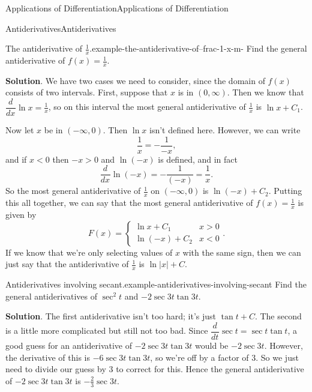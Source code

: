 \documentclass[10pt,]{book}
\numberwithin{equation}{section}
\newcommand{\dv}[3][]{\dfrac{d^{#1} #2}{d #3^{#1}}}
\begin{document}
\begin{chapterptx}{Applications of Differentiation}{}{Applications of Differentiation}{}{}
\begin{sectionptx}{Antiderivatives}{}{Antiderivatives}{}{}
\begin{example}{The antiderivative of \(\frac{1}{x}\).}{example-the-antiderivative-of--frac-1-x-m-}
\hypertarget{p-387}{}%
Find the general antiderivative of \(f(x) = \frac{1}{x}\).%
\par\smallskip%
\noindent\textbf{Solution}.\hypertarget{solution-86}{}\quad%
\hypertarget{p-388}{}%
We have two cases we need to consider, since the domain of \(f(x)\) consists of two intervals. First, suppose that \(x\) is in \((0,\infty)\). Then we know that \(\dv{}{x}\ln x = \frac{1}{x}\), so on this interval the most general antiderivative of \(\frac{1}{x}\) is \(\ln x + C_{1}\).%
\par
\hypertarget{p-389}{}%
Now let \(x\) be in \((-\infty,0)\). Then \(\ln x\) isn't defined here. However, we can write%
\begin{equation*}
\frac{1}{x} = -\frac{1}{-x},
\end{equation*}
and if \(x < 0\) then \(-x > 0\) and \(\ln(-x)\) is defined, and in fact%
\begin{equation*}
\dv{}{x}\ln(-x) = -\frac{1}{(-x)} = \frac{1}{x}.
\end{equation*}
So the most general antiderivative of \(\frac{1}{x}\) on \((-\infty,0)\) is \(\ln(-x) + C_{2}\). Putting this all together, we can say that the most general antiderivative of \(f(x) = \frac{1}{x}\) is given by%
\begin{equation*}
F(x) = \begin{cases} \ln x + C_{1} & x > 0 \\ \ln(-x) + C_{2} & x < 0\end{cases}.
\end{equation*}
If we know that we're only selecting values of \(x\) with the same sign, then we can just say that the antiderivative of \(\frac{1}{x}\) is \(\ln|x| + C\).%
\end{example}
\begin{example}{Antiderivatives involving secant.}{example-antiderivatives-involving-secant}%
\hypertarget{p-390}{}%
Find the general antiderivatives of \(\sec^{2}t\) and \(-2\sec3t\tan3t\).%
\par\smallskip%
\noindent\textbf{Solution}.\hypertarget{solution-87}{}\quad%
\hypertarget{p-391}{}%
The first antiderivative isn't too hard; it's just \(\tan t+C\). The second is a little more complicated but still not too bad. Since \(\dv{}{t}\sec t = \sec t\tan t\), a good guess for an antiderivative of \(-2\sec3t\tan3t\) would be \(-2\sec3t.\) However, the derivative of this is \(-6\sec3t\tan3t\), so we're off by a factor of \(3\). So we just need to divide our guess by \(3\) to correct for this. Hence the general antiderivative of \(-2\sec3t\tan3t\) is \(-\frac{2}{3}\sec3t\).%

\end{example}
\end{sectionptx}
\end{chapterptx}
\end{document}

